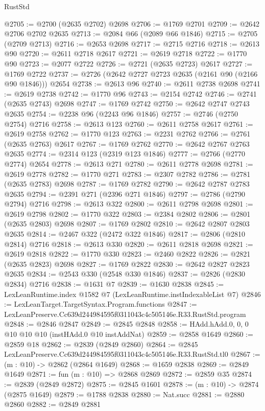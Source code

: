 \begin{lexlean}{RustStd}
\begin{coremodule}
@2705 := @2700 (@2635 @2702) @2698
@2706 := @1769 @2701
@2709 := @2642 @2706 @2702 @2635
@2713 := @2084 @66 (@2089 @66 @1846)
@2715 := @2705 (@2709 @2713)
@2716 := @2653 @2698
@2717 := @2715 @2716
@2718 := @2613 @90
@2720 := @2611 @2718 @2617
@2721 := @2619 @2718
@2722 := @1770 @90
@2723 := @2077 @2722
@2726 := @2721 (@2635 @2723) @2617
@2727 := @1769 @2722
@2737 := @2726 (@2642 @2727 @2723 @2635 (@2161 @90 (@2166 @90 @1846))) @2654
@2738 := @2613 @96
@2740 := @2611 @2738 @2698
@2741 := @2619 @2738
@2742 := @1770 @96
@2743 := @2154 @2742
@2746 := @2741 (@2635 @2743) @2698
@2747 := @1769 @2742
@2750 := @2642 @2747 @2743 @2635
@2754 := @2238 @96 (@2243 @96 @1846)
@2757 := @2746 (@2750 @2754) @2716
@2758 := @2613 @123
@2760 := @2611 @2758 @2617
@2761 := @2619 @2758
@2762 := @1770 @123
@2763 := @2231 @2762
@2766 := @2761 (@2635 @2763) @2617
@2767 := @1769 @2762
@2770 := @2642 @2767 @2763 @2635
@2774 := @2314 @123 (@2319 @123 @1846)
@2777 := @2766 (@2770 @2774) @2654
@2778 := @2613 @271
@2780 := @2611 @2778 @2698
@2781 := @2619 @2778
@2782 := @1770 @271
@2783 := @2307 @2782
@2786 := @2781 (@2635 @2783) @2698
@2787 := @1769 @2782
@2790 := @2642 @2787 @2783 @2635
@2794 := @2391 @271 (@2396 @271 @1846)
@2797 := @2786 (@2790 @2794) @2716
@2798 := @2613 @322
@2800 := @2611 @2798 @2698
@2801 := @2619 @2798
@2802 := @1770 @322
@2803 := @2384 @2802
@2806 := @2801 (@2635 @2803) @2698
@2807 := @1769 @2802
@2810 := @2642 @2807 @2803 @2635
@2814 := @2467 @322 (@2472 @322 @1846)
@2817 := @2806 (@2810 @2814) @2716
@2818 := @2613 @330
@2820 := @2611 @2818 @2698
@2821 := @2619 @2818
@2822 := @1770 @330
@2823 := @2460 @2822
@2826 := @2821 (@2635 @2823) @2698
@2827 := @1769 @2822
@2830 := @2642 @2827 @2823 @2635
@2834 := @2543 @330 (@2548 @330 @1846)
@2837 := @2826 (@2830 @2834) @2716
@2838 := @1631 @7
@2839 := @1630 @2838
@2845 := LexLeanRuntime.index @1582 @7 (LexLeanRuntime.instIndexableList @7)
@2846 := LexLeanTarget.TargetSyntax.Program.functions
@2847 := LexLeanPreserve.Cc639d244984595f0311043c4c505146e.R33.RustStd.program
@2848 := @2846 @2847
@2849 := @2845 @2848
@2858 := HAdd.hAdd.{0, 0, 0} @10 @10 @10 (instHAdd.{0} @10 instAddNat)
@2859 := @2858 @1649
@2860 := @2859 @18
@2862 := @2839 (@2849 @2860)
@2864 := @2845 LexLeanPreserve.Cc639d244984595f0311043c4c505146e.R33.RustStd.tl0
@2867 := (m : @10) -> @2862 (@2864 @1649)
@2868 := @1659 @2838
@2869 := @2849 @1649
@2871 := fun (m : @10) => @2868 @2869
@2872 := @2859 @35
@2874 := @2839 (@2849 @2872)
@2875 := @2845 @1601
@2878 := (m : @10) -> @2874 (@2875 @1649)
@2879 := @1788 @2838
@2880 := Nat.succ
@2881 := @2880 @2860
@2882 := @2849 @2881

\end{coremodule}
\end{lexlean}
